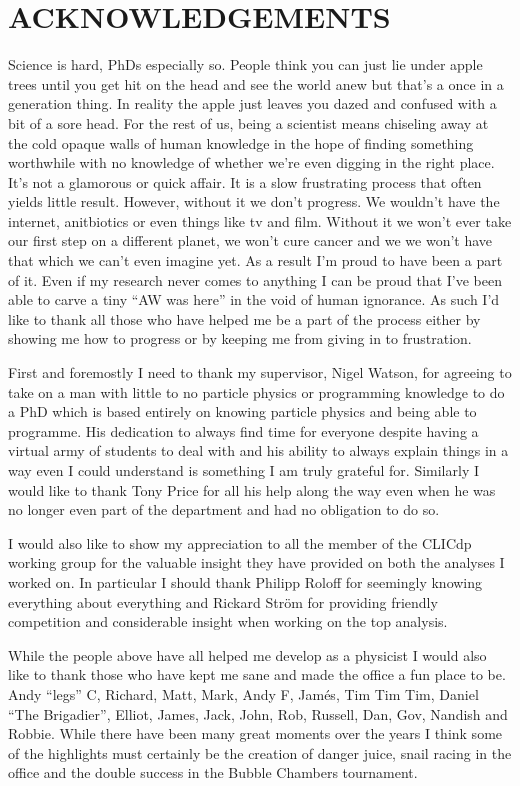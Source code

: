 %
\clearpage
\chapter*{ACKNOWLEDGEMENTS}
%
Science is hard, PhDs especially so. People think you can just lie under apple trees until you get hit on the head and see the world anew but that's a once in a generation thing. In reality the apple just leaves you dazed and confused with a bit of a sore head. For the rest of us, being a scientist means chiseling away at the cold opaque walls of human knowledge in the hope of finding something worthwhile with no knowledge of whether we're even digging in the right place. It's not a glamorous or quick affair. It is a slow frustrating process that often yields little result. However, without it we don't progress. We wouldn't have the internet, anitbiotics or even things like tv and film. Without it we won't ever take our first step on a different planet, we won't cure cancer and we we won't have that which we can't even imagine yet. As a result I'm proud to have been a part of it. Even if my research never comes to anything I can be proud that I've been able to carve a tiny ``AW was here'' in the void of human ignorance. As such I'd like to thank all those who have helped me be a part of the process either by showing me how to progress or by keeping me from giving in to frustration.  

First and foremostly I need to thank my supervisor, Nigel Watson, for agreeing to take on a man with little to no particle physics or programming knowledge to do a PhD which is based entirely on knowing particle physics and being able to programme. His dedication to always find time for everyone despite having a virtual army of students to deal with and his ability to always explain things in a way even I could understand is something I am truly grateful for. Similarly I would like to thank Tony Price for all his help along the way even when he was no longer even part of the department and had no obligation to do so.

I would also like to show my appreciation to all the member of the CLICdp working group for the valuable insight they have provided on both the analyses I worked on. In particular I should thank Philipp Roloff for seemingly knowing everything about everything and Rickard Str{\"o}m for providing friendly competition and considerable insight when working on the top analysis.

While the people above have all helped me develop as a physicist I would also like to thank those who have kept me sane and made the office a fun place to be. Andy ``legs'' C, Richard, Matt, Mark, Andy F, Jam\'{e}s, Tim Tim Tim, Daniel ``The Brigadier'', Elliot, James, Jack, John, Rob, Russell, Dan, Gov, Nandish and Robbie. While there have been many great moments over the years I think some of the highlights must certainly be the creation of danger juice, snail racing in the office and the double success in the Bubble Chambers tournament. 

